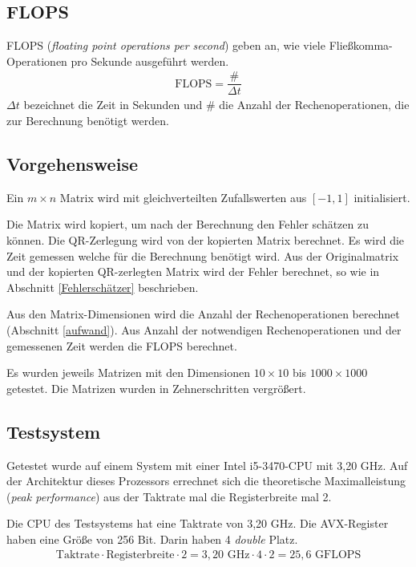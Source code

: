 \subsection{FLOPS}
FLOPS (\textit{floating point operations per second}) geben an, wie viele Fließkomma-Operationen pro Sekunde ausgeführt werden.
\begin{align*}
  \text{FLOPS} = \dfrac{\#}{\Delta t}
\end{align*}
$\Delta t$ bezeichnet die Zeit in Sekunden und $\#$ die Anzahl der Rechenoperationen, die zur Berechnung benötigt werden.

\subsection{Vorgehensweise}

Ein $m \times n$ Matrix wird mit gleichverteilten Zufallswerten aus $[-1,1]$ initialisiert.

Die Matrix wird kopiert, um nach der Berechnung den Fehler schätzen zu können. Die QR-Zerlegung wird von der kopierten Matrix berechnet. Es wird die Zeit gemessen welche für die Berechnung benötigt wird. 
Aus der Originalmatrix und der kopierten QR-zerlegten Matrix wird der Fehler berechnet, so wie in Abschnitt \ref{Fehlerschätzer} beschrieben.

Aus den Matrix-Dimensionen wird die Anzahl der Rechenoperationen berechnet (Abschnitt \ref{aufwand}).
Aus Anzahl der notwendigen Rechenoperationen und der gemessenen Zeit werden die FLOPS berechnet.

Es wurden jeweils Matrizen mit den Dimensionen $10 \times 10$ bis $1000 \times 1000$  getestet. Die Matrizen wurden in Zehnerschritten vergrößert.


\subsection{Testsystem}

Getestet wurde auf einem System mit einer Intel i5-3470-CPU mit 3,20 GHz. 
Auf der Architektur dieses Prozessors errechnet sich die theoretische Maximalleistung (\textit{peak performance}) aus der Taktrate mal die Registerbreite mal 2. 


Die CPU des Testsystems hat eine Taktrate von 3,20 GHz.
Die AVX-Register haben eine Größe von 256 Bit.
Darin haben 4 \textit{double} Platz.
\begin{align*}
  \text{Taktrate} \cdot \text{Registerbreite} \cdot 2= 3,20 \text{ GHz} \cdot 4 \cdot 2 = 25,6 \text{ GFLOPS}
\end{align*}

